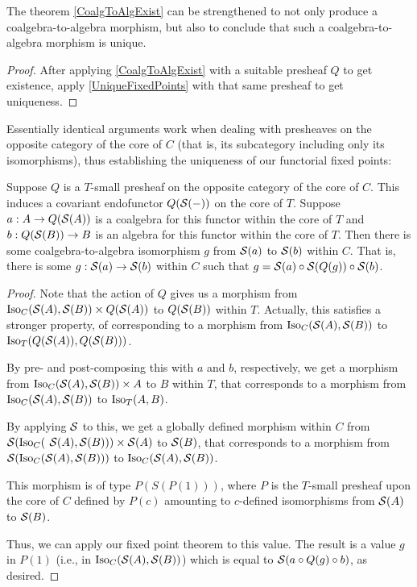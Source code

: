 \begin{theorem}
The theorem \cref{CoalgToAlgExist} can be strengthened to not only produce a coalgebra-to-algebra morphism, but also to conclude that such a coalgebra-to-algebra morphism is unique.
\end{theorem}
\begin{proof}
After applying \cref{CoalgToAlgExist} with a suitable presheaf $Q$ to get existence, apply \cref{UniqueFixedPoints} with that same presheaf to get uniqueness.
\end{proof}

Essentially identical arguments work when dealing with presheaves on the opposite category of the core of $C$ (that is, its subcategory including only its isomorphisms), thus establishing the uniqueness of our functorial fixed points:

\begin{theorem}\label{CoreCoalgToAlgExist}
Suppose $Q$ is a $T$-small presheaf on the opposite category of the core of $C$. This induces a covariant endofunctor $Q(\mathcal{S}(-))$ on the core of $T$. Suppose $a : A \to Q(\mathcal{S}(A))$ is a coalgebra for this functor within the core of $T$ and $b : Q(\mathcal{S}(B)) \to B$ is an algebra for this functor within the core of $T$. Then there is some coalgebra-to-algebra isomorphism $g$ from $\mathcal{S}(a)$ to $\mathcal{S}(b)$ within $C$. That is, there is some $g : \mathcal{S}(a) \to \mathcal{S}(b)$ within $C$ such that $g = \mathcal{S}(a) \circ \mathcal{S}(Q(g)) \circ \mathcal{S}(b)$.
\end{theorem}
\begin{proof}
Note that the action of $Q$ gives us a morphism from $\operatorname{Iso}_{C}(\mathcal{S}(A), \mathcal{S}(B)) \times Q(\mathcal{S}(A))$ to $Q(\mathcal{S}(B))$ within $T$. Actually, this satisfies a stronger property, of corresponding to a morphism from $\operatorname{Iso}_{C}(\mathcal{S}(A), \mathcal{S}(B))$ to $\operatorname{Iso}_T(Q(\mathcal{S}(A)), Q(\mathcal{S}(B)))$.

By pre- and post-composing this with $a$ and $b$, respectively, we get a morphism from $\operatorname{Iso}_C(\mathcal{S}(A), \mathcal{S}(B)) \times A$ to $B$ within $T$, that corresponds to a morphism from $\operatorname{Iso}_C(\mathcal{S}(A), \mathcal{S}(B))$ to $\operatorname{Iso}_T(A, B)$.

By applying $\mathcal{S}$ to this, we get a globally defined morphism within $C$ from $\mathcal{S}(\operatorname{Iso}_C($ $\mathcal{S}(A), \mathcal{S}(B))) \times \mathcal{S}(A)$ to $\mathcal{S}(B)$, that corresponds to a morphism from $\mathcal{S}(\operatorname{Iso}_C(\mathcal{S}(A), \mathcal{S}(B)))$ to $\operatorname{Iso}_C(\mathcal{S}(A), \mathcal{S}(B))$.

This morphism is of type $P(S(P(1)))$, where $P$ is the $T$-small presheaf upon the core of $C$ defined by $P(c)$ amounting to $c$-defined isomorphisms from $\mathcal{S}(A)$ to $\mathcal{S}(B)$.

Thus, we can apply our fixed point theorem  to this value. The result is a value $g$ in $P(1)$ (i.e., in $\operatorname{Iso}_C(\mathcal{S}(A), \mathcal{S}(B))$) which is equal to $\mathcal{S}(a \circ Q(g) \circ b)$, as desired.

\end{proof}

